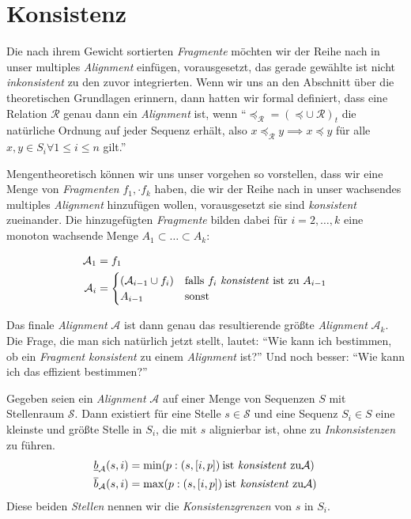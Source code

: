 \section{Konsistenz}

Die nach ihrem Gewicht sortierten \emph{Fragmente} möchten wir der Reihe nach in unser multiples \emph{Alignment} einfügen, vorausgesetzt, das gerade gewählte ist nicht \emph{inkonsistent} zu den zuvor integrierten. Wenn wir uns an den Abschnitt über die theoretischen Grundlagen erinnern, dann hatten wir formal definiert, dass eine Relation $\mathcal{R}$ genau dann ein \emph{Alignment} ist, wenn \enquote{$\preceq_{\mathcal{R}}=(\preceq \cup\: \mathcal{R})_t$ die natürliche Ordnung auf jeder Sequenz erhält, also $x \preceq_{\mathcal{R}} y \implies x \preceq y$ für alle $x,y \in S_i \forall 1\leq i \leq n$ gilt.}

Mengentheoretisch können wir uns unser vorgehen so vorstellen, dass wir eine Menge von \emph{Fragmenten} $f_1, \cdot f_k$ haben, die wir der Reihe nach in unser wachsendes multiples \emph{Alignment} hinzufügen wollen, vorausgesetzt sie sind \emph{konsistent} zueinander. Die hinzugefügten \emph{Fragmente} bilden dabei für $i = 2, \dots, k$ eine monoton wachsende Menge $A_1 \subset \dots \subset A_k$:

\begin{equation}
\begin{split}
	\mathcal{A}_1 &= f_1 \\
	\mathcal{A}_i &= 
		\begin{cases}
			(\mathcal{A}_{i-1} \cup f_i) & \text{falls $f_i$ \emph{konsistent} ist zu $A_{i-1}$} \\
			A_{i-1} & \text{sonst} 
		\end{cases}
\end{split}
\end{equation} 

Das finale \emph{Alignment} $\mathcal{A}$ ist dann genau das resultierende größte \emph{Alignment} $\mathcal{A}_k$. Die Frage, die man sich natürlich jetzt stellt, lautet: \enquote{Wie kann ich bestimmen, ob ein \emph{Fragment} \emph{konsistent} zu einem \emph{Alignment} ist?} Und noch besser: \enquote{Wie kann ich das effizient bestimmen?}

\begin{definition}[Konsistenzgrenze]
	Gegeben seien ein \emph{Alignment} $\mathcal{A}$ auf einer Menge von Sequenzen $S$ mit Stellenraum $\mathcal{S}$. Dann existiert für eine Stelle $s \in \mathcal{S}$ und eine Sequenz $S_i \in S$ eine kleinste und größte Stelle in $S_i$, die mit $s$ alignierbar ist, ohne zu \emph{Inkonsistenzen} zu führen.
	\begin{equation}
	\begin{split}
	\underline{b}_\mathcal{A}(s,i) &= \min(p: (s,[i,p])\: \text{ist \emph{konsistent} zu} \mathcal{A}) \\
	\overline{b}_\mathcal{A}(s,i) &= \max(p: (s,[i,p])\: \text{ist \emph{konsistent} zu} \mathcal{A})
	\end{split} 
	\end{equation}
	Diese beiden \emph{Stellen} nennen wir die \emph{Konsistenzgrenzen} von $s$ in $S_i$. 
\end{definition}

